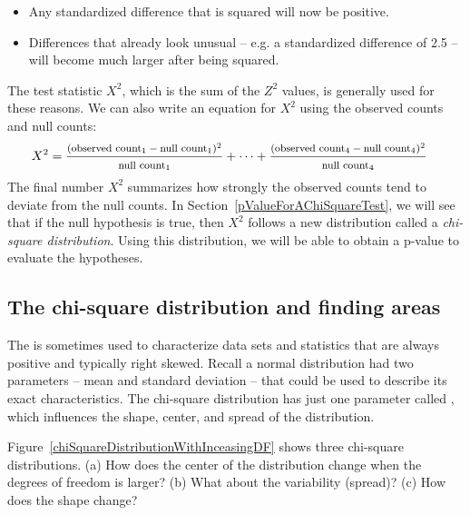 \begin{itemize}
\setlength{\itemsep}{0mm}
\item Any standardized difference that is squared will now be positive.
\item Differences that already look unusual -- e.g. a standardized difference of 2.5 -- will become much larger after being squared.
\end{itemize}
The test statistic $X^2$, which is the sum of the $Z^2$ values, is generally used for these reasons. We can also write an equation for $X^2$ using the observed counts and null counts:
\begin{align*}
X^2 &=
	\frac
	{\text{\footnotesize$(\text{observed count}_1 - \text{null count}_1)^2$}}
	{\text{\footnotesize$\text{null count}_1$}}
	+ \dots + \frac
	{\text{\footnotesize$(\text{observed count}_4 - \text{null count}_4)^2$}}
	{\text{\footnotesize$\text{null count}_4$}}
\end{align*}
The final number $X^2$ summarizes how strongly the observed counts tend to deviate from the null counts. In Section~\ref{pValueForAChiSquareTest}, we will see that if the null hypothesis is true, then $X^2$ follows a new distribution called a \emph{chi-square distribution}. Using this distribution, we will be able to obtain a p-value to evaluate the hypotheses.


\subsection{The chi-square distribution and finding areas}

The  is sometimes used to
characterize data sets and statistics that are always positive
and typically right skewed. Recall a normal distribution had
two parameters -- mean and standard deviation -- that could be
used to describe its exact characteristics.
The chi-square distribution has just one parameter called
,
which influences the shape, center, and spread of the distribution.

\begin{exercisewrap}
\begin{nexercise}\label{exerChiSquareDistributionDescriptionWithMoreDOF}
Figure~\ref{chiSquareDistributionWithInceasingDF} shows three chi-square distributions. (a) How does the center of the distribution change when the degrees of freedom is larger? (b) What about the variability (spread)? (c) How does the shape change?\footnotemark
\end{nexercise}
\end{exercisewrap}

